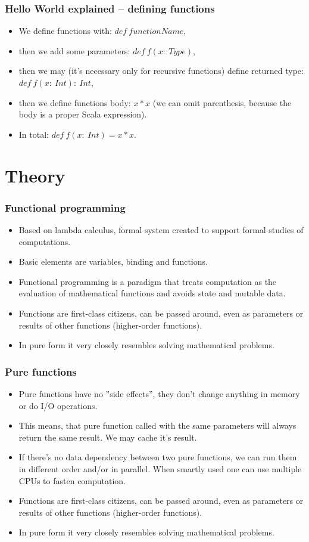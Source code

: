 \documentclass[xcolor=dvipsnames]{beamer}
\begin{document}
\begin{frame}
\frametitle{Hello World explained -- defining functions}
\begin{itemize}
\item We define functions with: $def\:functionName$,
\item then we add some parameters: $def\:f(x:\:Type)$,
\item then we may (it's necessary only for recursive functions) define returned type: $def\:f(x:\:Int):\:Int$,
\item then we define functions body: $x * x$ (we can omit parenthesis, because the body is a proper Scala expression).
\item In total: $def\:f(x:\:Int) = x * x$.
\end{itemize}
\end{frame}


\section{Theory}

\begin{frame}
\frametitle{Functional programming}
\begin{itemize}
\item Based on lambda calculus, formal system created to support formal studies of computations.
\item Basic elements are variables, binding and functions.
\item Functional programming is a paradigm that treats computation as the evaluation of mathematical functions and avoids state and mutable data.
\item Functions are first-class citizens, can be passed around, even as parameters or results of other functions (higher-order functions).
\item In pure form it very closely resembles solving mathematical problems.
\end{itemize}
\end{frame}

\begin{frame}
\frametitle{Pure functions}
\begin{itemize}
\item Pure functions have no ''side effects'', they don't change anything in memory or do I/O operations.
\item This means, that pure function called with the same parameters will always return the same result. We may cache it's result.
\item If there's no data dependency between two pure functions, we can run them in different order and/or in parallel. When smartly used one can use multiple CPUs to fasten computation.
\item Functions are first-class citizens, can be passed around, even as parameters or results of other functions (higher-order functions).
\item In pure form it very closely resembles solving mathematical problems.
\end{itemize}
\end{frame}
\end{document}

